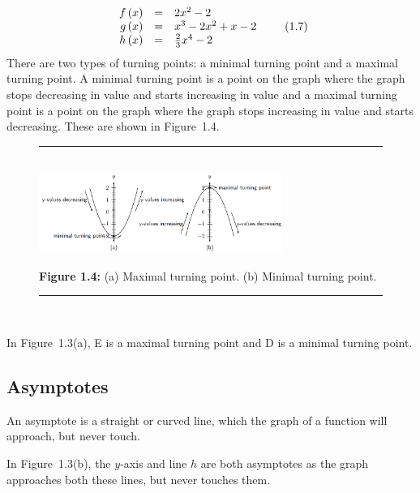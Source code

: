     \begin{equation}
    \begin{array}{ccc}\hfill f\left(x\right)& =& 2{x}^{2}-2\hfill \\ \hfill g\left(x\right)& =& {x}^{3}-2{x}^{2}+x-2\hfill \\ \hfill h\left(x\right)& =& \frac{2}{3}{x}^{4}-2\hfill \end{array}\tag{1.7}
      \end{equation}
        \label{m39337*id236788}There are two types of turning points: a minimal turning point and a maximal turning point. A minimal turning point is a point on the graph where the graph stops decreasing in value and starts increasing in value and a maximal turning point is a point on the graph where the graph stops increasing in value and starts decreasing. These are shown in Figure~1.4.\par 
    \setcounter{subfigure}{0}
	\begin{figure}[H] %
    \begin{center}
    \rule[.1in]{\figurerulewidth}{.005in} \\
        \label{m39337*uid48!!!underscore!!!media}\label{m39337*uid48!!!underscore!!!printimage}\includegraphics[width=300px]{col11306.imgs/m39337_MG10C11_035.png} %
      \vspace{2pt}
    \vspace{\rubberspace}\par \begin{cnxcaption}
	  \small \textbf{Figure 1.4: }(a) Maximal turning point. (b) Minimal turning point.
	\end{cnxcaption}
    \vspace{.1in}
    \rule[.1in]{\figurerulewidth}{.005in} \\
    \end{center}
 \end{figure}       
        \label{m39337*id236816}In Figure~1.3(a), E is a maximal turning point and D is a minimal turning point.\par 
      \label{m39337*uid49}
            \subsection{ Asymptotes}
            \nopagebreak
        \label{m39337*id236837}An asymptote is a straight or curved line, which the graph of a function will approach, but never touch.\par 
        \label{m39337*id236844}In Figure~1.3(b), the $y$-axis and line $h$ are both asymptotes as the graph approaches both these lines, but never touches them.\par 
      \label{m39337*uid50}
